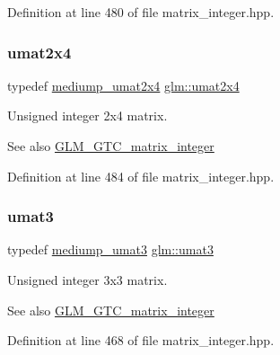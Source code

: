 Definition at line 480 of file matrix\+\_\+integer.\+hpp.

\mbox{\label{group__gtc__matrix__integer_ga3b23b164240cf4dfb429776da7be9d88}} 
\subsubsection{\texorpdfstring{umat2x4}{umat2x4}}
{\footnotesize\ttfamily typedef \hyperlink{group__gtc__matrix__integer_gaf79e9c80f024d31f3d66ddae75e90b6c}{mediump\+\_\+umat2x4} \hyperlink{group__gtc__matrix__integer_ga3b23b164240cf4dfb429776da7be9d88}{glm\+::umat2x4}}

Unsigned integer 2x4 matrix. \begin{DoxySeeAlso}{See also}
\hyperlink{group__gtc__matrix__integer}{G\+L\+M\+\_\+\+G\+T\+C\+\_\+matrix\+\_\+integer} 
\end{DoxySeeAlso}


Definition at line 484 of file matrix\+\_\+integer.\+hpp.

\mbox{\label{group__gtc__matrix__integer_ga8b8fbc858e28abf8fc344744f8d6d368}} 
\subsubsection{\texorpdfstring{umat3}{umat3}}
{\footnotesize\ttfamily typedef \hyperlink{group__gtc__matrix__integer_ga123f7d8bac8849e3a150bdf8a21e44a2}{mediump\+\_\+umat3} \hyperlink{group__gtc__matrix__integer_ga8b8fbc858e28abf8fc344744f8d6d368}{glm\+::umat3}}

Unsigned integer 3x3 matrix. \begin{DoxySeeAlso}{See also}
\hyperlink{group__gtc__matrix__integer}{G\+L\+M\+\_\+\+G\+T\+C\+\_\+matrix\+\_\+integer} 
\end{DoxySeeAlso}


Definition at line 468 of file matrix\+\_\+integer.\+hpp.

